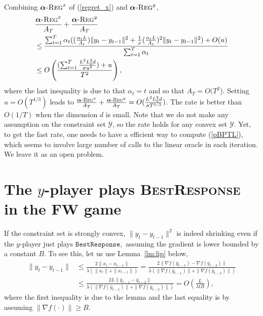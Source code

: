 \documentclass[final,12pt]{colt2018} %
\def\balpha{\boldsymbol{\alpha}}
\def\BR{\textsc{BestResponse}\xspace}
\newcommand{\regret}[1]{\balpha\textsc{-Reg}^{#1}}
\newcommand{\YY}{\mathcal{Y}}
\newcommand{\pr}[1]{\left(#1\right)}
\begin{document}
Combining $\regret{x}$ of (\ref{regret_x}) and $\regret{y}$,
\begin{equation}
\begin{aligned}
&\frac{ \regret{x} }{ A_T} + \frac{ \regret{y} }{ A_T}
\\ & \leq  \frac{\sum_{t=1}^T
\alpha_t  ( (\frac{\alpha_t L}{A_t})  \| y_t - y_{t-1} \|^2 + \frac{1}{\sigma} (\frac{\alpha_t L }{A_t})^2  \| y_t - y_{t-1} \|^2 ) + O(u)
 }{ \sum_{t=1}^T \alpha_t}
\\ & \leq  O\pr{ \frac{ (\sum_{t=1}^T \frac{L^2 L_0^2 d}{ \sigma u^2} ) + u }{T^2} },
\end{aligned}
\end{equation}
where the last inequality is due to that $\alpha_t = t$ and so that $A_T = O(T^2$). Setting $u=O(T^{{1/3}})$ leads to 
$\frac{ \regret{x} }{ A_T} + \frac{ \regret{y} }{ A_T}  =O(\frac{L^2 L_0^2 d}{\sigma T^{5/3}})$.
The rate is better than $O(1/T)$ when the dimension $d$ is small.
Note that we do not make any assumption on the constraint set $\YY$, so the rate holds for any convex set $\YY$.
Yet, to get the fast rate, one needs to have a efficient way to compute (\ref{pBPTL}),
which seems to involve large number of calls to the linear oracle in each iteration.
We leave it as an open problem.

\section{The $y$-player plays \BR in the FW game} \label{app:BR}


If the constraint set is strongly convex, $\| y_t - y_{t-1}  \|^2$ is indeed shrinking even if the $y$-player just plays $\texttt{BestResponse},$
assuming the gradient is lower bounded by a constant $B$.
To see this, let us use Lemma~\ref{lm:lip} below, 
\begin{equation} \label{shrink}
\begin{aligned}
\| y_t - y_{t-1}\| & \leq \frac{ 2 \| x_t - x_{t-1} \|}{ \lambda ( \| x_t\| + \| x_{t-1}\| ) }
= \frac{ 2 \| \nabla f( \bar{y}_{t-1}) - \nabla f( \bar{y}_{t-2}) \|}{ \lambda ( \| \nabla f( \bar{y}_{t-1})\| + \| \nabla f( \bar{y}_{t-2})\| ) }
\\ & \leq 
\frac{ 2 L \| \bar{y}_{t-1} - \bar{y}_{t-2} \|}{ \lambda ( \| \nabla f( \bar{y}_{t-1})\| + \| \nabla f( \bar{y}_{t-2})\| ) }
= O( \frac{L}{\lambda t B}),
\end{aligned}
\end{equation}
where the first inequality is due to the lemma and the last equality is by assuming 
$\| \nabla f( \cdot)\| \geq B$.
\end{document}
